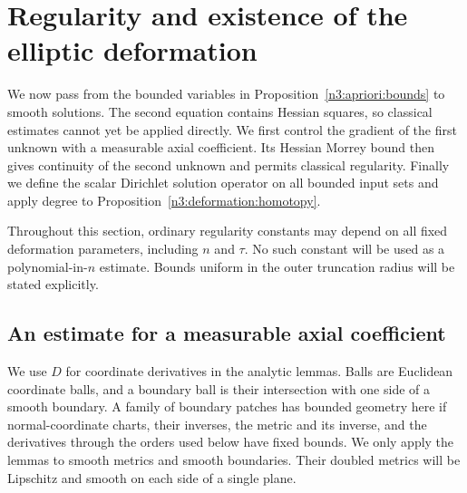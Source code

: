 \section{Regularity and existence of the elliptic deformation}
\label{n3:existence:section}

We now pass from the bounded variables in
Proposition~\ref{n3:apriori:bounds} to smooth solutions. The second equation
contains Hessian squares, so classical estimates cannot yet be applied
directly. We first control the gradient of the first unknown with a
measurable axial coefficient. Its Hessian Morrey bound then gives
continuity of the second unknown and permits classical regularity.
Finally we define the scalar Dirichlet solution operator on all bounded
input sets and apply degree to
Proposition~\ref{n3:deformation:homotopy}.

Throughout this section, ordinary regularity constants may depend on
all fixed deformation parameters, including $n$ and $\tau$.  No such
constant will be used as a polynomial-in-$n$ estimate.  Bounds uniform
in the outer truncation radius will be stated explicitly.

\subsection{An estimate for a measurable axial coefficient}

We use $D$ for coordinate derivatives in the analytic lemmas.  Balls
are Euclidean coordinate balls, and a boundary ball is their
intersection with one side of a smooth boundary.  A family of boundary
patches has bounded geometry here if normal-coordinate charts, their
inverses, the metric and its inverse, and the derivatives through the
orders used below have fixed bounds.  We only apply the lemmas to
smooth metrics and smooth boundaries.  Their doubled metrics will be
Lipschitz and smooth on each side of a single plane.

